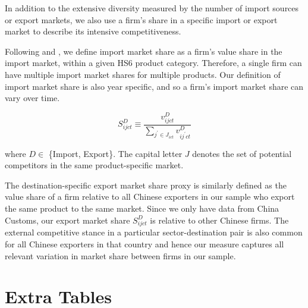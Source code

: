 \documentclass[12pt]{article}
\begin{document}
In addition to the extensive diversity measured by the number of import sources or export markets, we also use a firm's share in a specific import or export market to describe its intensive competitiveness.

Following \cite{aik2014} and \cite{devereux2017}, we define import market share as a firm’s value share in the import market, within a given HS6 product category. Therefore, a single firm can have multiple import market shares for multiple products. Our definition of import market share is also year specific, and so a firm’s import market share can vary over time. 

$$
S^{D}_{ijct} \equiv \frac{v^{D}_{ijct}}{\sum_{j^{\prime} \in J_{ict}} v^{D}_{ij^{\prime}ct}}
$$

where $D \in$ \{Import, Export\}. The capital letter $J$ denotes the set of potential competitors in the same product-specific market. 

The destination-specific export market share proxy is similarly defined as the value share of a firm relative to all Chinese exporters in our sample who export the same product to the same market. Since we only have data from China Customs, our export market share $S^{D}_{ijct}$ is relative to other Chinese firms. The external competitive stance in a particular sector-destination pair is also common for all Chinese exporters in that country and hence our measure captures all relevant variation in market share between firms in our sample.

\section{Extra Tables}\label{Appendix-Tables}
\end{document}
